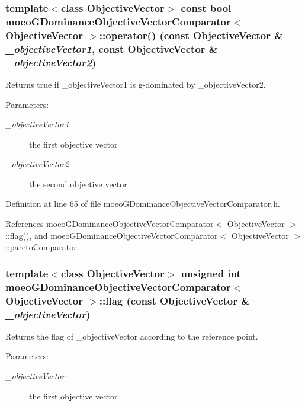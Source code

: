 \subsubsection{\setlength{\rightskip}{0pt plus 5cm}template$<$class Objective\-Vector$>$ const bool \bf{moeo\-GDominance\-Objective\-Vector\-Comparator}$<$ Objective\-Vector $>$::operator() (const Objective\-Vector \& {\em \_\-objective\-Vector1}, const Objective\-Vector \& {\em \_\-objective\-Vector2})\hspace{0.3cm}{\tt  [inline]}}\label{classmoeoGDominanceObjectiveVectorComparator_4b8c3496d77abf6e774333f3296e6d79}


Returns true if \_\-objective\-Vector1 is g-dominated by \_\-objective\-Vector2. 

\begin{Desc}
\item[Parameters:]
\begin{description}
\item[{\em \_\-objective\-Vector1}]the first objective vector \item[{\em \_\-objective\-Vector2}]the second objective vector \end{description}
\end{Desc}


Definition at line 65 of file moeo\-GDominance\-Objective\-Vector\-Comparator.h.

References moeo\-GDominance\-Objective\-Vector\-Comparator$<$ Objective\-Vector $>$::flag(), and moeo\-GDominance\-Objective\-Vector\-Comparator$<$ Objective\-Vector $>$::pareto\-Comparator.
\subsubsection{\setlength{\rightskip}{0pt plus 5cm}template$<$class Objective\-Vector$>$ unsigned int \bf{moeo\-GDominance\-Objective\-Vector\-Comparator}$<$ Objective\-Vector $>$::flag (const Objective\-Vector \& {\em \_\-objective\-Vector})\hspace{0.3cm}{\tt  [inline, private]}}\label{classmoeoGDominanceObjectiveVectorComparator_75bf5141369522563e60d4e3ac2ec9cb}


Returns the flag of \_\-objective\-Vector according to the reference point. 

\begin{Desc}
\item[Parameters:]
\begin{description}
\item[{\em \_\-objective\-Vector}]the first objective vector \end{description}
\end{Desc}


